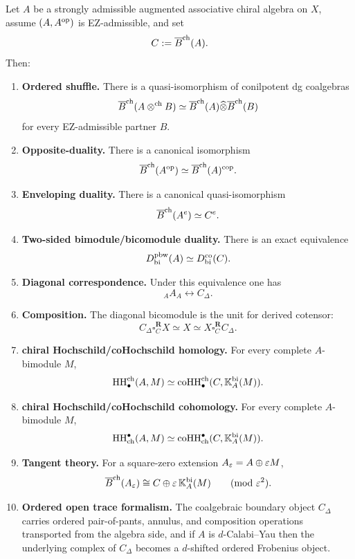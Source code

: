 \begin{theorem}
\label{thm:master}
Let $A$ be a strongly admissible augmented associative chiral algebra on $X$, assume
$(A,A^{\mathrm{op}})$ is EZ-admissible, and set
\[
C:=\overline{B}^{\mathrm{ch}}(A).
\]
Then:
\begin{enumerate}[label=(\arabic*)]
\item \textbf{Ordered shuffle.}
There is a quasi-isomorphism of conilpotent dg coalgebras
\[
\overline{B}^{\mathrm{ch}}(A\mathbin{\otimes^{\mathrm{ch}}} B)\simeq \overline{B}^{\mathrm{ch}}(A)\widehat\otimes \overline{B}^{\mathrm{ch}}(B)
\]
for every EZ-admissible partner $B$.

\item \textbf{Opposite-duality.}
There is a canonical isomorphism
\[
\overline{B}^{\mathrm{ch}}(A^{\mathrm{op}})\simeq \overline{B}^{\mathrm{ch}}(A)^{\mathrm{cop}}.
\]

\item \textbf{Enveloping duality.}
There is a canonical quasi-isomorphism
\[
\overline{B}^{\mathrm{ch}}(A^e)\simeq C^e.
\]

\item \textbf{Two-sided bimodule/bicomodule duality.}
There is an exact equivalence
\[
D^{\mathrm{pbw}}_{\mathrm{bi}}(A)\simeq D^{\mathrm{co}}_{\mathrm{bi}}(C).
\]

\item \textbf{Diagonal correspondence.}
Under this equivalence one has
\[
{}_A A_A \longleftrightarrow C_\Delta.
\]

\item \textbf{Composition.}
The diagonal bicomodule is the unit for derived cotensor:
\[
C_\Delta\square_C^{\mathbf R} X\simeq X\simeq X\square_C^{\mathbf R}C_\Delta.
\]

\item \textbf{chiral Hochschild/coHochschild homology.}
For every complete $A$-bimodule $M$,
\[
\operatorname{HH}^{\mathrm{ch}}_\bullet(A,M)
\simeq
\operatorname{coHH}^{\mathrm{ch}}_\bullet(C,\mathbb{K}_A^{\mathrm{bi}}(M)).
\]

\item \textbf{chiral Hochschild/coHochschild cohomology.}
For every complete $A$-bimodule $M$,
\[
\operatorname{HH}_{\mathrm{ch}}^\bullet(A,M)
\simeq
\operatorname{coHH}_{\mathrm{ch}}^\bullet(C,\mathbb{K}_A^{\mathrm{bi}}(M)).
\]

\item \textbf{Tangent theory.}
For a square-zero extension $A_\varepsilon=A\oplus \varepsilon M$,
\[
\Barch(A_\eps)\cong C\oplus \eps\,\KK_A^{\mathrm{bi}}(M)\qquad (\mathrm{mod}\ \eps^2).
\]

\item \textbf{Ordered open trace formalism.}
The coalgebraic boundary object $C_\Delta$ carries ordered pair-of-pants, annulus, and composition
operations transported from the algebra side, and if $A$ is $d$-Calabi--Yau then the underlying
complex of $C_\Delta$ becomes a $d$-shifted ordered Frobenius object.
\end{enumerate}
\end{theorem}

